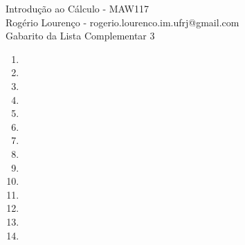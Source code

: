 \documentclass{article}
\begin{document}
\begin{flushleft}
	Introdução ao Cálculo - MAW117\\
	Rogério Lourenço - rogerio.lourenco.im.ufrj@gmail.com\\
	Gabarito da Lista Complementar 3
\end{flushleft}

\begin{enumerate}
	\item
	\item
	\item
	\item
	\item
	\item
	\item
	\item
	\item
	\item
	\item
	\item
	\item
	\item
\end{enumerate}
\end{document}
